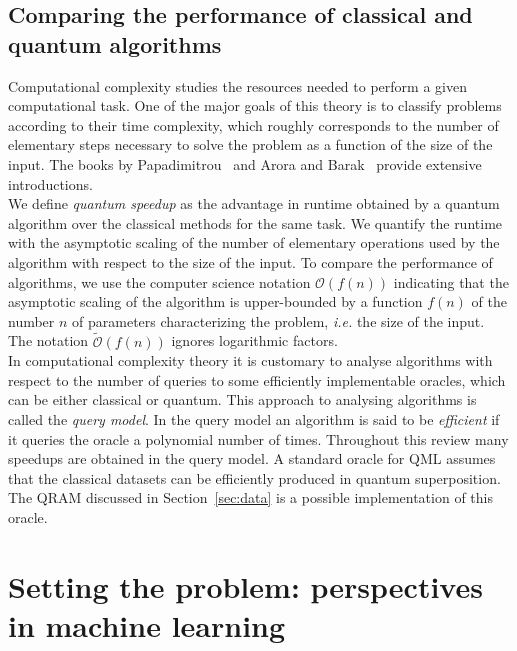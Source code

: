 \documentclass[a4paper, 11pt]{article}
\begin{document}
\subsection*{Comparing the performance of classical and quantum algorithms}

Computational complexity studies the resources needed to perform a given computational task. One of the major goals of this theory is to classify problems according to their time complexity, which roughly corresponds to the number of elementary steps necessary to solve the problem as a function of the size of the input. The books by Papadimitrou~\cite{papadimitriou2003computational} and Arora and Barak~\cite{arora2009computational} provide extensive introductions. \\

We define \textit{quantum speedup} as the advantage in runtime obtained by a quantum algorithm over the classical methods for the same task. We quantify the runtime with the asymptotic scaling of the number of elementary operations used by the algorithm with respect to the size of the input. To compare the performance of algorithms, we use the computer science notation $\mathcal{O}(f(n))$ indicating that the asymptotic scaling of the algorithm is upper-bounded by a function $f(n)$ of the number $n$ of parameters characterizing the problem, \textit{i.e.} the size of the input. The notation $\tilde{\mathcal{O}}(f(n))$ ignores logarithmic factors. \\

In computational complexity theory it is customary to analyse algorithms with respect to the number of queries to some efficiently implementable oracles, which can be either classical or quantum. This approach to analysing algorithms is called the \textit{query model}. In the query model an algorithm is said to be \textit{efficient} if it queries the oracle a polynomial number of times. Throughout this review many speedups are obtained in the query model. A standard oracle for QML assumes that the classical datasets can be efficiently produced in quantum superposition. The QRAM discussed in Section~\ref{sec:data} is a possible implementation of this oracle.


\section{Setting the problem: perspectives in machine learning} 
\label{sec:setting}
\end{document}
